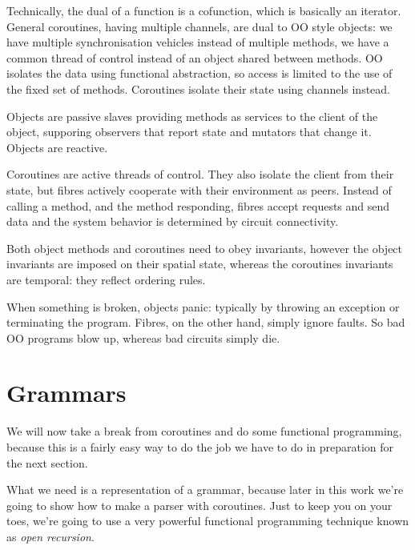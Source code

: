 \documentclass[oneside]{book}
\begin{document}
Technically, the dual of a function is a cofunction, which is
basically an iterator. General coroutines, having multiple
channels, are dual to OO style objects: we have multiple
synchronisation vehicles instead of multiple methods,
we have a common thread of control instead of an object
shared between methods. OO isolates the data using functional
abstraction, so access is limited to the use of the fixed
set of methods. Coroutines isolate their state using channels
instead.

Objects are passive slaves providing methods as services
to the client of the object, supporing observers that report
state and mutators that change it. Objects are reactive.

Coroutines are active threads of control. They also isolate
the client from their state, but fibres actively cooperate
with their environment as peers. Instead of calling a method,
and the method responding, fibres accept requests and send
data and the system behavior is determined by circuit connectivity.

Both object methods and coroutines need to obey invariants,
however the object invariants are imposed on their spatial
state, whereas the coroutines invariants are temporal:
they reflect ordering rules.

When something is broken, objects panic: typically by throwing
an exception or terminating the program. Fibres, on the other
hand, simply ignore faults. So bad OO programs blow up,
whereas bad circuits simply die.

\chapter{Grammars}
We will now take a break from coroutines and do some functional
programming, because this is a fairly easy way to do the job
we have to do in preparation for the next section.

What we need is a representation of a grammar, because later in this
work we're going to show how to make a parser with coroutines.
Just to keep you on your toes, we're going to use a very powerful
functional programming technique known as {\em open recursion}.
\end{document}
